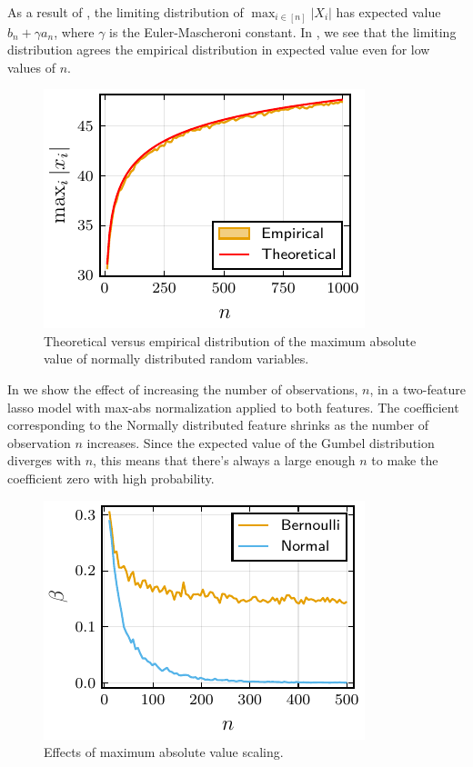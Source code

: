 As a result of , the limiting distribution of \(\max_{i \in [n]}|X_i|\) has expected value \(b_n + \gamma a_n\), where \(\gamma\) is the Euler-Mascheroni constant. In , we see that the limiting distribution agrees the empirical distribution in expected value even for low values of \(n\).

\begin{figure}[htpb]
  \centering
  \includegraphics[]{plots/maxabs_gev.pdf}
  \caption{%
    Theoretical versus empirical distribution of the maximum absolute value of normally distributed random variables.
  }
  \label{fig:maxabs-gev}
\end{figure}

In  we show the effect of increasing the number of observations, \(n\), in a two-feature lasso model with max-abs normalization applied to both features. The coefficient corresponding to the Normally distributed feature shrinks as the number of observation \(n\) increases. Since the expected value of the Gumbel distribution diverges with \(n\), this means that there's always a large enough \(n\) to make the coefficient zero with high probability.

\begin{figure}[htpb]
  \centering
  \includegraphics[]{plots/maxabs_n.pdf}
  \caption{%
    Effects of maximum absolute value scaling.
  }
  \label{fig:maxabs-n}
\end{figure}


